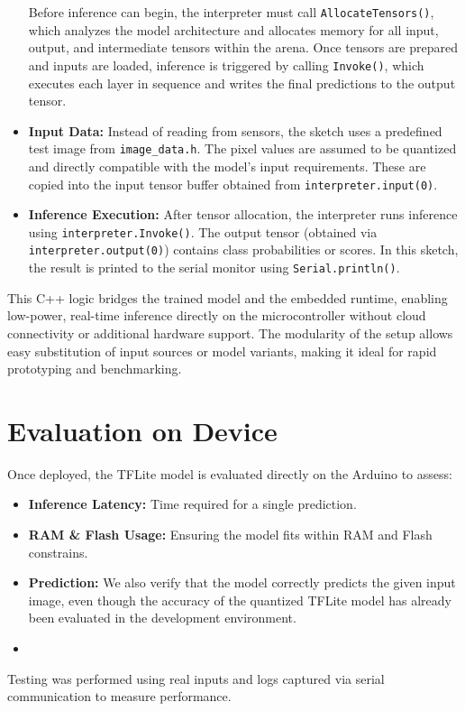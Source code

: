 \begin{itemize}
    Before inference can begin, the interpreter must call \texttt{AllocateTensors()}, which analyzes the model architecture and allocates memory for all input, output, and intermediate tensors within the arena. Once tensors are prepared and inputs are loaded, inference is triggered by calling \texttt{Invoke()}, which executes each layer in sequence and writes the final predictions to the output tensor.
    

    \item \textbf{Input Data:} 
    Instead of reading from sensors, the sketch uses a predefined test image from \texttt{image\_data.h}. The pixel values are assumed to be quantized and directly compatible with the model's input requirements. These are copied into the input tensor buffer obtained from \texttt{interpreter.input(0)}.

    \item \textbf{Inference Execution:} 
    After tensor allocation, the interpreter runs inference using \texttt{interpreter.Invoke()}. The output tensor (obtained via \texttt{interpreter.output(0)}) contains class probabilities or scores. In this sketch, the result is printed to the serial monitor using \texttt{Serial.println()}.
\end{itemize}

This C++ logic bridges the trained model and the embedded runtime, enabling low-power, real-time inference directly on the microcontroller without cloud connectivity or additional hardware support. The modularity of the setup allows easy substitution of input sources or model variants, making it ideal for rapid prototyping and benchmarking.

\section{Evaluation on Device}

Once deployed, the TFLite model is evaluated directly on the Arduino to assess:

\begin{itemize}

\item \textbf{Inference Latency:} Time required for a single prediction.

\item \textbf{RAM \& Flash Usage:} Ensuring the model fits within RAM and Flash constrains.

\item \textbf{Prediction:} We also verify that the model correctly predicts the given input image, even though the accuracy of the quantized TFLite model has already been evaluated in the development environment.

\item {}


\end{itemize}

Testing was performed using real inputs and logs captured via serial communication to measure performance.

